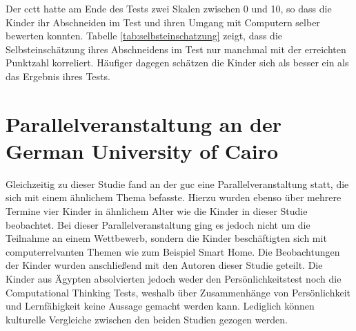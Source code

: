 	Der \acrshort{cctt} hatte am Ende des Tests zwei Skalen zwischen 0 und 10, so dass die Kinder ihr Abschneiden im Test und ihren Umgang mit Computern selber bewerten konnten. Tabelle \ref{tab:selbsteinschatzung} zeigt, dass die Selbsteinschätzung ihres Abschneidens im Test nur manchmal mit der erreichten Punktzahl korreliert. Häufiger dagegen schätzen die Kinder sich als besser ein als das Ergebnis ihres Tests. 



\section{Parallelveranstaltung an der German University of Cairo}
Gleichzeitig zu dieser Studie fand an der \acrlong{guc} eine Parallelveranstaltung statt, die sich mit einem ähnlichem Thema befasste. Hierzu wurden ebenso über mehrere Termine vier Kinder in ähnlichem Alter wie die Kinder in dieser Studie beobachtet. Bei dieser Parallelveranstaltung ging es jedoch nicht um die Teilnahme an einem Wettbewerb, sondern die Kinder beschäftigten sich mit computerrelvanten Themen wie zum Beispiel Smart Home. Die Beobachtungen der Kinder wurden anschließend mit den Autoren dieser Studie geteilt. Die Kinder aus Ägypten absolvierten jedoch weder den Persönlichkeitstest noch die Computational Thinking Tests, weshalb über Zusammenhänge von Persönlichkeit und Lernfähigkeit keine Aussage gemacht werden kann. Lediglich können kulturelle Vergleiche zwischen den beiden Studien gezogen werden.

